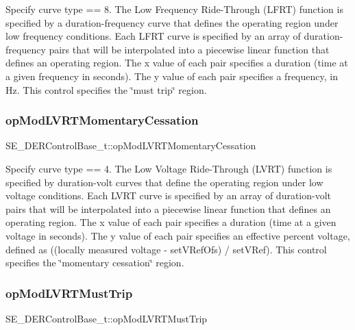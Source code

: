 Specify curve type == 8. The Low Frequency Ride-\/\+Through (L\+F\+RT) function is specified by a duration-\/frequency curve that defines the operating region under low frequency conditions. Each L\+F\+RT curve is specified by an array of duration-\/frequency pairs that will be interpolated into a piecewise linear function that defines an operating region. The x value of each pair specifies a duration (time at a given frequency in seconds). The y value of each pair specifies a frequency, in Hz. This control specifies the \char`\"{}must trip\char`\"{} region. \mbox{\label{group__DERControlBase_ga2741d46500aa811e2ed79fe29493729a}} 
\subsubsection{\texorpdfstring{op\+Mod\+L\+V\+R\+T\+Momentary\+Cessation}{opModLVRTMomentaryCessation}}
{\footnotesize\ttfamily S\+E\+\_\+\+D\+E\+R\+Control\+Base\+\_\+t\+::op\+Mod\+L\+V\+R\+T\+Momentary\+Cessation}

Specify curve type == 4. The Low Voltage Ride-\/\+Through (L\+V\+RT) function is specified by duration-\/volt curves that define the operating region under low voltage conditions. Each L\+V\+RT curve is specified by an array of duration-\/volt pairs that will be interpolated into a piecewise linear function that defines an operating region. The x value of each pair specifies a duration (time at a given voltage in seconds). The y value of each pair specifies an effective percent voltage, defined as ((locally measured voltage -\/ set\+V\+Ref\+Ofs) / set\+V\+Ref). This control specifies the \char`\"{}momentary cessation\char`\"{} region. \mbox{\label{group__DERControlBase_ga53df2db63947a75e9d4a8b83ee434cf7}} 
\subsubsection{\texorpdfstring{op\+Mod\+L\+V\+R\+T\+Must\+Trip}{opModLVRTMustTrip}}
{\footnotesize\ttfamily S\+E\+\_\+\+D\+E\+R\+Control\+Base\+\_\+t\+::op\+Mod\+L\+V\+R\+T\+Must\+Trip}

